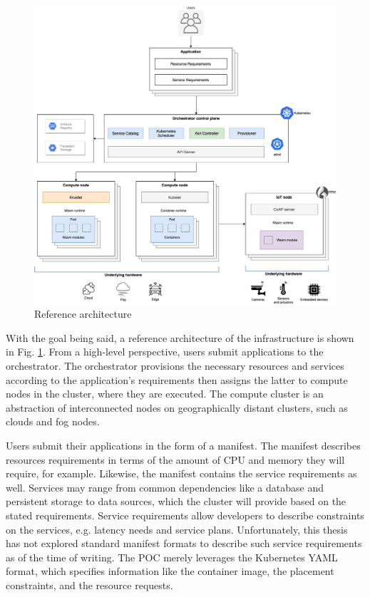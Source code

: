 \begin{figure}[ht]
\centering
\includegraphics[width=\columnwidth]{figures/architecture}
\caption{Reference architecture \label{fig:architecture}}
\end{figure}

With the goal being said, a reference architecture of the infrastructure is shown in Fig. \ref{fig:architecture}. From a high-level perspective, users submit applications to the orchestrator. The orchestrator provisions the necessary resources and services according to the application's requirements then assigns the latter to compute nodes in the cluster, where they are executed. The compute cluster is an abstraction of interconnected nodes on geographically distant clusters, such as clouds and fog nodes.

Users submit their applications in the form of a manifest. The manifest describes resources requirements in terms of the amount of CPU and memory they will require, for example. Likewise, the manifest contains the service requirements as well. Services may range from common dependencies like a database and persistent storage to data sources, which the cluster will provide based on the stated requirements. Service requirements allow developers to describe constraints on the services, e.g. latency needs and service plans. Unfortunately, this thesis has not explored standard manifest formats to describe such service requirements as of the time of writing. The POC merely leverages the Kubernetes YAML format, which specifies information like the container image, the placement constraints, and the resource requests.

